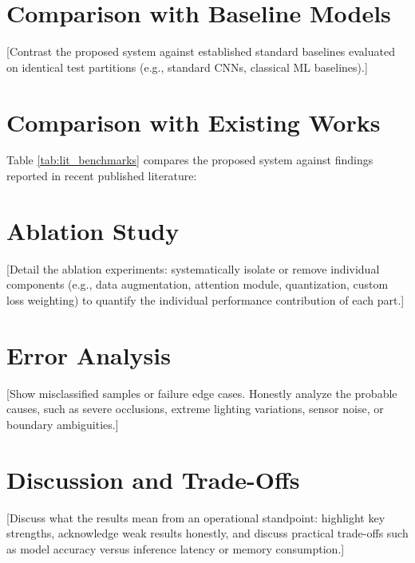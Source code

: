 \section{Comparison with Baseline Models}
[Contrast the proposed system against established standard baselines evaluated on identical test partitions (e.g., standard CNNs, classical ML baselines).]

\section{Comparison with Existing Works}
Table \ref{tab:lit_benchmarks} compares the proposed system against findings reported in recent published literature:

\begin{table}[htbp]
\centering
\caption{Comparison with published results from recent literature}
\label{tab:lit_benchmarks}
\vspace{0.2cm}
\end{table}

\section{Ablation Study}
[Detail the ablation experiments: systematically isolate or remove individual components (e.g., data augmentation, attention module, quantization, custom loss weighting) to quantify the individual performance contribution of each part.]

\section{Error Analysis}
[Show misclassified samples or failure edge cases. Honestly analyze the probable causes, such as severe occlusions, extreme lighting variations, sensor noise, or boundary ambiguities.]

\section{Discussion and Trade-Offs}
[Discuss what the results mean from an operational standpoint: highlight key strengths, acknowledge weak results honestly, and discuss practical trade-offs such as model accuracy versus inference latency or memory consumption.]

